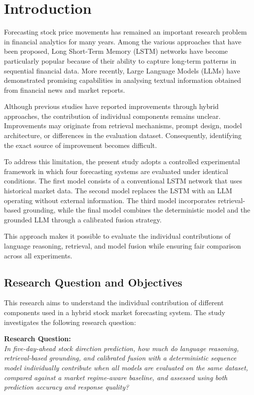 \section{Introduction}\label{sec:introduction}

Forecasting stock price movements has remained an important research
problem in financial analytics for many years. Among the various
approaches that have been proposed, Long Short-Term Memory (LSTM)
networks have become particularly popular because of their ability to
capture long-term patterns in sequential financial data. More recently,
Large Language Models (LLMs) have demonstrated promising capabilities in
analysing textual information obtained from financial news and market
reports.

Although previous studies have reported improvements through hybrid
approaches, the contribution of individual components remains unclear.
Improvements may originate from retrieval mechanisms, prompt design,
model architecture, or differences in the evaluation dataset.
Consequently, identifying the exact source of improvement becomes
difficult.

To address this limitation, the present study adopts a controlled
experimental framework in which four forecasting systems are evaluated
under identical conditions. The first model consists of a conventional
LSTM network that uses historical market data. The second model replaces
the LSTM with an LLM operating without external information. The third
model incorporates retrieval-based grounding, while the final model
combines the deterministic model and the grounded LLM through a
calibrated fusion strategy.

This approach makes it possible to evaluate the individual contributions
of language reasoning, retrieval, and model fusion while ensuring fair
comparison across all experiments.

\subsection{Research Question and Objectives}\label{sec:research-question}

This research aims to understand the individual contribution of
different components used in a hybrid stock market forecasting system.
The study investigates the following research question:

\textbf{Research Question:\\
}\emph{In five-day-ahead stock direction prediction, how much do
language reasoning, retrieval-based grounding, and calibrated fusion
with a deterministic sequence model individually contribute when all
models are evaluated on the same dataset, compared against a market
regime-aware baseline, and assessed using both prediction accuracy and
response quality?}

